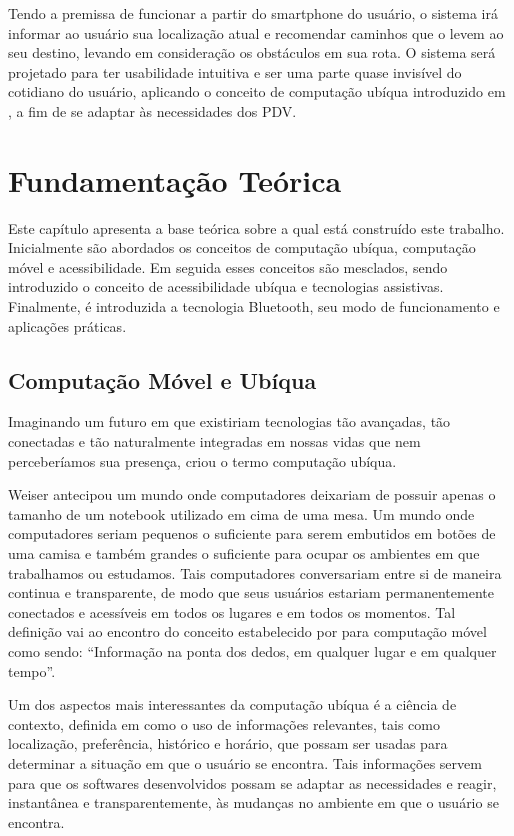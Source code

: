 \documentclass[twoside,english,brazilian]{UNISINOSartigo}
\begin{document}
Tendo a premissa de funcionar a partir do smartphone do usuário, o sistema irá informar ao usuário sua localização atual e recomendar caminhos que o levem ao seu destino, levando em consideração os obstáculos em sua rota. O sistema será projetado para ter usabilidade intuitiva e ser uma parte quase invisível do cotidiano do usuário, aplicando o conceito de computação ubíqua introduzido em , a fim de se adaptar às necessidades dos PDV.

\section{Fundamentação Teórica}
Este capítulo apresenta a base teórica sobre a qual está construído este trabalho. Inicialmente são abordados os conceitos de computação ubíqua, computação móvel e acessibilidade. Em seguida esses conceitos são mesclados, sendo introduzido o conceito de acessibilidade ubíqua e tecnologias assistivas. Finalmente, é introduzida a tecnologia Bluetooth, seu modo de funcionamento e aplicações práticas.

\subsection{Computação Móvel e Ubíqua}
Imaginando um futuro em que existiriam tecnologias tão avançadas, tão conectadas e tão naturalmente integradas em nossas vidas que nem perceberíamos sua presença,  criou o termo computação ubíqua. 

Weiser antecipou um mundo onde computadores deixariam de possuir apenas o tamanho de um notebook utilizado em cima de uma mesa. Um mundo onde computadores seriam pequenos o suficiente para serem embutidos em botões de uma camisa e também grandes o suficiente para ocupar os ambientes em que trabalhamos ou estudamos. Tais computadores conversariam entre si de maneira continua e transparente, de modo que seus usuários estariam permanentemente conectados e acessíveis em todos os lugares e em todos os momentos. Tal definição vai ao encontro do conceito estabelecido por  para computação móvel como sendo: “Informação na ponta dos dedos, em qualquer lugar e em qualquer tempo”.

Um dos aspectos mais interessantes da computação ubíqua é a ciência de contexto, definida em  como o uso de informações relevantes, tais como localização, preferência, histórico e horário, que possam ser usadas para determinar a situação em que o usuário se encontra. Tais informações servem para que os softwares desenvolvidos possam se adaptar as necessidades e reagir, instantânea e transparentemente, às mudanças no ambiente em que o usuário se encontra.
\end{document}
